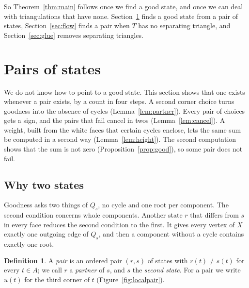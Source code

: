 \documentclass[10pt]{amsart}
\numberwithin{equation}{section}
\theoremstyle{definition}
\newtheorem{definition}[equation]{Definition}
\theoremstyle{remark}
\newcommand{\T}{T}
\begin{document}
So Theorem~\ref{thm:main} follows once we find a good state, and once we can deal with triangulations that have none.
Section~\ref{sec:pairs} finds a good state from a pair of states, Section~\ref{sec:flow} finds a pair when $\T$ has no separating triangle, and Section~\ref{sec:glue} removes separating triangles.

\section{Pairs of states}\label{sec:pairs}

We do not know how to point to a good state.
This section shows that one exists whenever a pair exists, by a count in four steps.
A second corner choice turns goodness into the absence of cycles (Lemma~\ref{lem:partner}).
Every pair of choices gets a sign, and the pairs that fail cancel in twos (Lemma~\ref{lem:cancel}).
A weight, built from the white faces that certain cycles enclose, lets the same sum be computed in a second way (Lemma~\ref{lem:height}).
The second computation shows that the sum is not zero (Proposition~\ref{prop:good}), so some pair does not fail.

\subsection*{Why two states}
Goodness asks two things of $Q_s$, no cycle and one root per component.
The second condition concerns whole components.
Another state $r$ that differs from $s$ in every face reduces the second condition to the first.
It gives every vertex of $X$ exactly one outgoing edge of $Q_s$, and then a component without a cycle contains exactly one root.

\begin{definition}
A \emph{pair} is an ordered pair $(r,s)$ of states with $r(t)\neq s(t)$ for every $t\in A$; we call $r$ a \emph{partner} of $s$, and $s$ the \emph{second state}.
For a pair we write $u(t)$ for the third corner of $t$ (Figure~\ref{fig:localpair}).
\end{definition}
\end{document}
